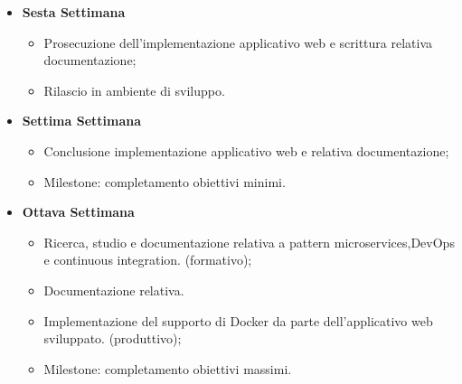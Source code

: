 {\begin{itemize}
\begin{itemize}
            \item Prosecuzione dell’implementazione dell’applicativo e scrittura relativa documentazione;
            \item Rilascio in ambiente di sviluppo della prima base di applicazione;
            \item Documentazione relativa.
        \end{itemize}
        \item \textbf{Sesta Settimana } 
        \begin{itemize}
            \item Prosecuzione dell’implementazione applicativo web e scrittura relativa documentazione;
            \item  Rilascio in ambiente di sviluppo.
        \end{itemize}
        \item \textbf{Settima Settimana} 
        \begin{itemize}
            \item Conclusione implementazione applicativo web e relativa
documentazione;
            \item Milestone: completamento obiettivi minimi.
        \end{itemize}
        \item \textbf{Ottava Settimana} 
        \begin{itemize}
            \item Ricerca, studio e documentazione relativa a pattern microservices,DevOps e continuous integration. (formativo);
            \item Documentazione relativa.
            \item Implementazione del supporto di Docker da parte dell’applicativo web sviluppato. (produttivo);
            \item Milestone: completamento obiettivi massimi.
        \end{itemize}
    \end{itemize}
}

\newcommand{\totaleOre}{320}

\newcommand{\obiettiviFormativiMinimi}{
	 \item \underline{\textit{FMI1}}: Conoscenza dello stack tecnologico basato su Node.js, MongoDB,
Mongoose e AngularJS, peculiarità, pro e contro. Quali sono i possibili
casi d’uso e quali no;

	 \item \underline{\textit{FMI2}}:Esplorazione e studio di soluzioni di system integration verso ERP SAP
B1 e/o al servizio Google Analytics;
	 \item \underline{\textit{FMI3}}:  Esplorazione del modello DevOps orientato a rilasci frequenti e
automatizzati, non solo SW Engineering & QA ma anche IT Ops.
	 
}

